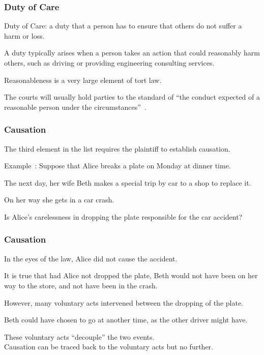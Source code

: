 \begin{frame}
\frametitle{Duty of Care}

\alert{Duty of Care}: a duty that a person has to ensure that others do not suffer a harm or loss.

A duty typically arises when a person takes an action that could reasonably harm others, such as driving or providing engineering consulting services.

\alert{Reasonableness} is a very large element of tort law. 

The courts will usually hold parties to the standard of ``the conduct expected of a reasonable person under the circumstances''~\cite{lpe}.

\end{frame}



\begin{frame}
\frametitle{Causation}

The third element in the list requires the plaintiff to establish causation.

Example~\cite{lba}: Suppose that Alice breaks a plate on Monday at dinner time.

The next day, her wife Beth makes a special trip by car to a shop to replace it.

On her way she gets in a car crash.

Is Alice's carelessness in dropping the plate responsible for the car accident?

\end{frame}



\begin{frame}
\frametitle{Causation}

In the eyes of the law, Alice did not cause the accident.

It is true that had Alice not dropped the plate, Beth would not have been on her way to the store, and not have been in the crash.

However, many voluntary acts intervened between the dropping of the plate.

Beth could have chosen to go at another time, as the other driver might have.

These voluntary acts ``decouple'' the two events.\\
\quad Causation can be traced back to the voluntary acts but no further.

\end{frame}



